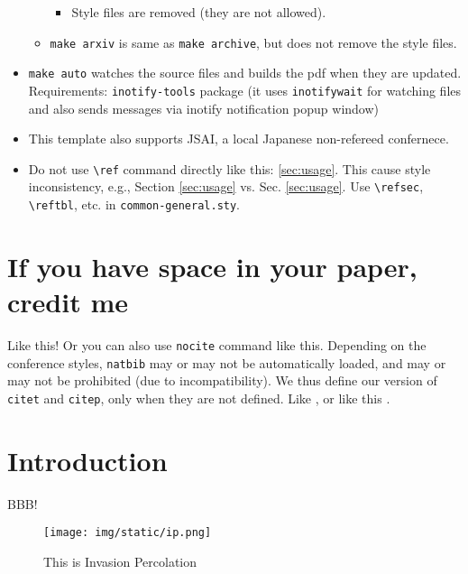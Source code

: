 \begin{itemize}
\begin{itemize}
    \begin{itemize}
    
    \item
      Style files are removed (they are not allowed).
    \end{itemize}
  \item
    \texttt{make\ arxiv} is same as \texttt{make\ archive}, but does not
    remove the style files.
  \end{itemize}
\item
  \texttt{make\ auto} watches the source files and builds the pdf when
  they are updated. Requirements: \texttt{inotify-tools} package (it
  uses \texttt{inotifywait} for watching files and also sends messages
  via inotify notification popup window)
\item
  This template also supports JSAI, a local Japanese non-refereed
  confernece.
 \item Do not use \texttt{\textbackslash{}ref} command directly like this: \ref{sec:usage}.
       This cause style inconsistency, e.g., Section \ref{sec:usage} vs. Sec. \ref{sec:usage}.
       Use \texttt{\textbackslash{}refsec}, \texttt{\textbackslash{}reftbl}, etc.
       in \texttt{common-general.sty}.
\end{itemize}



\section{If you have space in your paper, credit me}

Like this! \cite{aaai-template}
Or you can also use \texttt{nocite} command like this. \nocite{aaai-template}
Depending on the conference styles,
\texttt{natbib} may or may not be automatically loaded,
and may or may not be prohibited (due to incompatibility).
We thus define our version of \texttt{citet} and \texttt{citep},
only when they are not defined.
Like \citet{aaai-template}, or like this \citep{aaai-template}.

\section{Introduction}

BBB!  \cite{Asai2016}

\begin{figure}[tb]
 \texttt{[image: img/static/ip.png]}
 \caption{This is Invasion Percolation}
 \label{fig:ip}
\end{figure}

